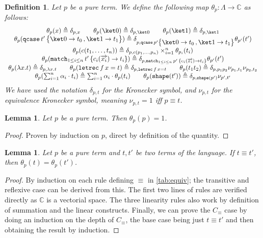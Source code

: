\documentclass[10pt,a4paper]{article}
\newcommand{\textqcase}{\ensuremath{\mathtt{qcase}}}
\newcommand{\textmatch}{\ensuremath{\mathtt{match}}}
\newcommand{\textletrec}{\ensuremath{\mathtt{letrec}}}
\newcommand{\zket}{\ket 0}
\newcommand{\oket}{\ket 1}
\newcommand{\qcasebase}[2]{
  \textqcase\,#1\left\{\! \begin{aligned} #2 \end{aligned}\right\}
}
\newcommand{\qcase}[3]{
  \qcasebase {#1} {\zket \to #2\,, \oket \to #3}
}
\newcommand{\matchdefaultcollapsedany}[2]{
  \textmatch_{1 \leq i \leq n}\,#1\,\{
    c_i(\overrightarrow{x_i}) \to #2_i
  \}
}
\newcommand{\matchdefaultcollapsed}[1]{\matchdefaultcollapsedany{#1}{t}}
\newcommand{\lbd}[2]{\lambda #1 .#2}
\newcommand{\letrec}[3]{\textletrec\,#1\,#2=#3}
\newcommand{\shape}[1]{\mathtt{shape}(#1)}
\newcommand{\equivcontext}{\ensuremath{C_\equiv}}
\newcommand\kron[2]{\delta_{#1, #2}}
\newcommand{\qt}[2]{\theta_{#1}(#2)}
\newcommand{\kroneq}[2]{\nu_{#1, #2}}
\newtheorem{lemma}[theorem]{Lemma}
\newtheorem{definition}[theorem]{Definition}
\begin{document}
\begin{definition}\label{def:quantity}
  Let $p$ be a pure term.
  We define the following map $\theta_p : \Lambda \to \mathbb C$ as follows:
  \begingroup
  \renewcommand{\arraystretch}{1.5}
  \[
    \begin{array}{c}
      \qt p x \triangleq \delta_{p, x} \qquad \qt p \zket \triangleq
      \delta_{p, \zket}
      \qquad \qt p \oket \triangleq \delta_{p, \oket} \\
      \qt p {\qcase {t'} {t_0} {t_1}} \triangleq \delta_{p,
      \qcase{p'}{t_0}{t_1}} \qt{p'}{t'} \\
      \qt p {c(t_1, \dots, t_n)} \triangleq \delta_{p, c(p_1, \dots, p_n)}
      \times_{i=1}^n \qt{p_i}{t_i} \\
      \qt p {\matchdefaultcollapsed{t'}} \triangleq
      \delta_{p, \matchdefaultcollapsed{p'}} \qt{p'}{t'} \\
      \qt p {\lbd x t} \triangleq \delta_{p, \lbd x t} \qquad \qt p {\letrec f
      x t} \triangleq \delta_{p, \letrec f x t} \qquad
      \qt p {t_1t_2} \triangleq \kron p {p_1p_2} \kroneq {p_1} {t_1} \kroneq
      {p_2} {t_2}  \\
      \qt p {\sum_{i=1}^n \alpha_i \cdot t_i} \triangleq
      \sum_{i=1}^n \alpha_i
      \cdot \qt p {t_i}
      \qquad \qt p {\shape{t'}} \triangleq \kron p {\shape{p'}}
      \kroneq {p'} {t'}
    \end{array}
  \]
  \endgroup
  We have used the notation $\kron p t$ for the Kronecker symbol,
  and $\kroneq p t$ for the equivalence Kronecker symbol, meaning
  $\kroneq p t = 1$ iff $p \equiv t$.
\end{definition}

\begin{lemma}\label{lem:quantity-one}
  Let $p$ be a pure term.
  Then $\qt p p = 1$.
\end{lemma}

\begin{proof}
  Proven by induction on $p$, direct by definition of the quantity. \qedhere
\end{proof}

\begin{lemma}\label{lem:quantity-equiv}
  Let $p$ be a pure term and $t, t'$ be two terms of the language.
  If $t \equiv t'$, then $\qt p t = \qt p {t'}$.
\end{lemma}

\begin{proof}
  By induction on each rule defining $\equiv$ in \autoref{tab:equiv};
  the transitive and reflexive case can be derived from this.
  The first two lines of rules are verified directly as $\mathbb C$
  is a vectorial space.
  The three linearity rules also work by definition of summation and
  the linear constructs.
  Finally, we can prove the $\equivcontext$ case by doing an
  induction on the depth of $\equivcontext$,
  the base case being just $t \equiv t'$ and then obtaining the
  result by induction. \qedhere
\end{proof}
\end{document}
